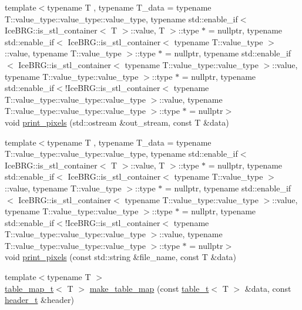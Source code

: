 \begin{DoxyCompactItemize}
{\footnotesize template$<$typename T , typename T\+\_\+data  = typename T\+::value\+\_\+type\+::value\+\_\+type\+::value\+\_\+type, typename std\+::enable\+\_\+if$<$ Ice\+B\+R\+G\+::is\+\_\+stl\+\_\+container$<$ T $>$\+::value, T $>$\+::type $\ast$  = nullptr, typename std\+::enable\+\_\+if$<$ Ice\+B\+R\+G\+::is\+\_\+stl\+\_\+container$<$ typename T\+::value\+\_\+type $>$\+::value, typename T\+::value\+\_\+type $>$\+::type $\ast$  = nullptr, typename std\+::enable\+\_\+if$<$ Ice\+B\+R\+G\+::is\+\_\+stl\+\_\+container$<$ typename T\+::value\+\_\+type\+::value\+\_\+type $>$\+::value, typename T\+::value\+\_\+type\+::value\+\_\+type $>$\+::type $\ast$  = nullptr, typename std\+::enable\+\_\+if$<$!\+Ice\+B\+R\+G\+::is\+\_\+stl\+\_\+container$<$ typename T\+::value\+\_\+type\+::value\+\_\+type\+::value\+\_\+type $>$\+::value, typename T\+::value\+\_\+type\+::value\+\_\+type\+::value\+\_\+type $>$\+::type $\ast$  = nullptr$>$ }\\void \hyperlink{namespaceIceBRG_a5c2f8ff1ebca7dea7058492da6c9cb81}{print\+\_\+pixels} (std\+::ostream \&out\+\_\+stream, const T \&data)
\item 
{\footnotesize template$<$typename T , typename T\+\_\+data  = typename T\+::value\+\_\+type\+::value\+\_\+type\+::value\+\_\+type, typename std\+::enable\+\_\+if$<$ Ice\+B\+R\+G\+::is\+\_\+stl\+\_\+container$<$ T $>$\+::value, T $>$\+::type $\ast$  = nullptr, typename std\+::enable\+\_\+if$<$ Ice\+B\+R\+G\+::is\+\_\+stl\+\_\+container$<$ typename T\+::value\+\_\+type $>$\+::value, typename T\+::value\+\_\+type $>$\+::type $\ast$  = nullptr, typename std\+::enable\+\_\+if$<$ Ice\+B\+R\+G\+::is\+\_\+stl\+\_\+container$<$ typename T\+::value\+\_\+type\+::value\+\_\+type $>$\+::value, typename T\+::value\+\_\+type\+::value\+\_\+type $>$\+::type $\ast$  = nullptr, typename std\+::enable\+\_\+if$<$!\+Ice\+B\+R\+G\+::is\+\_\+stl\+\_\+container$<$ typename T\+::value\+\_\+type\+::value\+\_\+type\+::value\+\_\+type $>$\+::value, typename T\+::value\+\_\+type\+::value\+\_\+type\+::value\+\_\+type $>$\+::type $\ast$  = nullptr$>$ }\\void \hyperlink{namespaceIceBRG_a44ae5278f1a504368ffedf3064c6b186}{print\+\_\+pixels} (const std\+::string \&file\+\_\+name, const T \&data)
\item 
{\footnotesize template$<$typename T $>$ }\\\hyperlink{namespaceIceBRG_a30d3b56b57feeb81f66815ff1bfaec6c}{table\+\_\+map\+\_\+t}$<$ T $>$ \hyperlink{namespaceIceBRG_a8b16d77487fb029cea7629dc52bd7dc7}{make\+\_\+table\+\_\+map} (const \hyperlink{namespaceIceBRG_a59734b1a7b525d7d926f69a91bc8553b}{table\+\_\+t}$<$ T $>$ \&data, const \hyperlink{namespaceIceBRG_a49e8b48f1dbd351e9748e7cbe80705df}{header\+\_\+t} \&header)

\end{DoxyCompactItemize}
